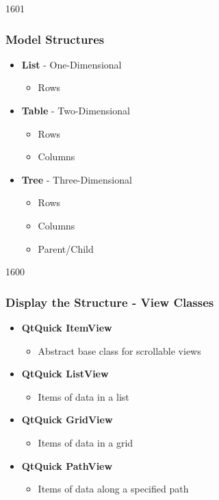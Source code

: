 \begin{slide}{1601}\frametitle{Model Structures}
 \begin{itemize}
 \item \textbf{List} - One-Dimensional
    \begin{itemize}
    \item Rows
   \end{itemize}
  \item \textbf{Table} - Two-Dimensional
    \begin{itemize}
    \item Rows
    \item Columns
    \end{itemize}
  \item \textbf{Tree} - Three-Dimensional
    \begin{itemize}
    \item Rows
    \item Columns
    \item Parent/Child
    \end{itemize}
  \end{itemize}
\medskip
{}
\end{slide}


\begin{slide}{1600}\frametitle{Display the Structure - View Classes}
\begin{itemize}
 \item \textbf{QtQuick ItemView}
   \begin{itemize}
   \item Abstract base class for scrollable views
   \end{itemize}
\item \textbf{QtQuick ListView}
  \begin{itemize}
  \item Items of data in a list
  \end{itemize}
\item \textbf{QtQuick GridView}
  \begin{itemize}
  \item Items of data in a grid
  \end{itemize}
\item \textbf{QtQuick PathView}
  \begin{itemize}
  \item Items of data along a specified path
  \end{itemize}
\end{itemize}
\end{slide}


